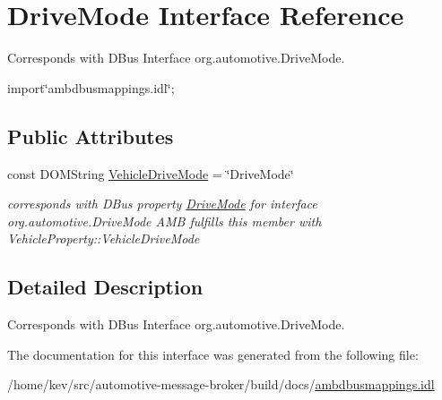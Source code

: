 \hypertarget{interfaceDriveMode}{\section{Drive\+Mode Interface Reference}
\label{interfaceDriveMode}
}


Corresponds with D\+Bus Interface org.\+automotive.\+Drive\+Mode.  




{\ttfamily import\char`\"{}ambdbusmappings.\+idl\char`\"{};}

\subsection*{Public Attributes}
\begin{DoxyCompactItemize}
\item 
\hypertarget{interfaceDriveMode_ae9c83f119100359aefcd52251b2d827e}{const D\+O\+M\+String \hyperlink{interfaceDriveMode_ae9c83f119100359aefcd52251b2d827e}{Vehicle\+Drive\+Mode} = \char`\"{}Drive\+Mode\char`\"{}}\label{interfaceDriveMode_ae9c83f119100359aefcd52251b2d827e}

\begin{DoxyCompactList}\small\item\em corresponds with D\+Bus property \hyperlink{interfaceDriveMode}{Drive\+Mode} for interface org.\+automotive.\+Drive\+Mode A\+M\+B fulfills this member with Vehicle\+Property\+::\+Vehicle\+Drive\+Mode \end{DoxyCompactList}\end{DoxyCompactItemize}


\subsection{Detailed Description}
Corresponds with D\+Bus Interface org.\+automotive.\+Drive\+Mode. 

The documentation for this interface was generated from the following file\+:\begin{DoxyCompactItemize}
\item 
/home/kev/src/automotive-\/message-\/broker/build/docs/\hyperlink{ambdbusmappings_8idl}{ambdbusmappings.\+idl}\end{DoxyCompactItemize}
